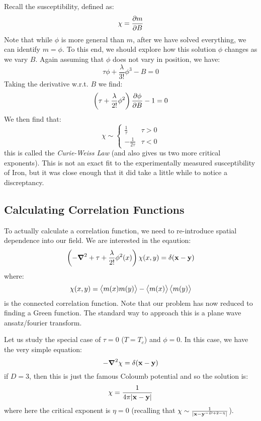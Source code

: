 Recall the susceptibility, defined as:
\begin{equation}
    \chi = \frac{\partial m}{\partial B}
\end{equation}
Note that while $\phi$ is more general than $m$, after we have solved everything, we can identify $m = \phi$. To this end, we should explore how this solution $\phi$ changes as we vary $B$. Again assuming that $\phi$ does not vary in position, we have:
\begin{equation}
    \tau \phi + \frac{\lambda}{3!}\phi^3 - B = 0
\end{equation}
Taking the derivative w.r.t. $B$ we find:
\begin{equation}
    \left(\tau + \frac{\lambda}{2!}\phi^2\right)\dpd{\phi}{B} - 1 = 0
\end{equation}
We then find that:
\begin{equation}
    \chi \sim \begin{cases}
        \frac{1}{\tau} & \tau > 0
        \\ -\frac{1}{2\tau} & \tau < 0
    \end{cases}
\end{equation}
this is called the \emph{Curie-Weiss Law} (and also gives us two more critical exponents). This is not an exact fit to the experimentally measured susceptibility of Iron, but it was close enough that it did take a little while to notice a discreptancy.

\subsection{Calculating Correlation Functions}
To actually calculate a correlation function, we need to re-introduce spatial dependence into our field. We are interested in the eqaution:
\begin{equation}
    \left(-\nabla^2 + \tau + \frac{\lambda}{2!}\phi^2(x)\right)\chi(x, y) = \delta(\v{x} - \v{y})
\end{equation}
where:
\begin{equation}
    \chi(x, y) = \left< m(x)m(y) \right> - \left< m(x) \right>\left< m(y) \right>
\end{equation}
is the connected correlation function. Note that our problem has now reduced to finding a Green function. The standard way to approach this is a plane wave ansatz/fourier transform.

Let us study the special case of $\tau = 0$ ($T = T_c$) and $\phi = 0$. In this case, we have the very simple equation:
\begin{equation}
    -\nabla^2 \chi = \delta(\v{x} - \v{y})
\end{equation}
if $D = 3$, then this is just the famous Coloumb potential and so the solution is:
\begin{equation}
    \chi = \frac{1}{4\pi \lvert \mathbf{x} - \mathbf{y} \rvert}
\end{equation}
where here the critical exponent is $\eta = 0$ (recalling that $\chi \sim \frac{1}{\lvert \mathbf{x} - \mathbf{y}^{-D + 2 - \eta} \rvert}$). 

